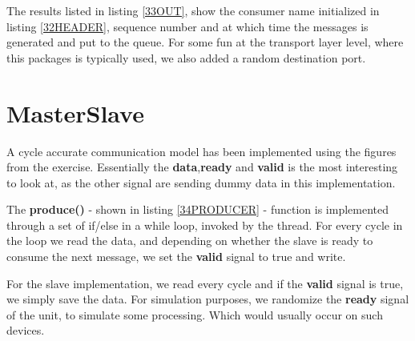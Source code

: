\documentclass[a4paper,12pt]{report}    %
\begin{document}


The results listed in listing \ref{33OUT}, show the consumer name initialized in listing \ref{32HEADER}, sequence number and at which time the messages is generated and put to the queue. For some fun at the transport layer level, where this packages is typically used, we also added a random destination port.

\lstset{style=output}




\newpage

\section{MasterSlave}
A cycle accurate communication model has been implemented using the figures from the exercise. Essentially the \textbf{data},\textbf{ready} and \textbf{valid} is the most interesting to look at, as the other signal are sending dummy data in this implementation.


\lstset{style=code}


The \textbf{produce()} - shown in listing \ref{34PRODUCER} - function is implemented through a set of if/else in a while loop, invoked by the thread. For every cycle in the loop we read the data, and depending on whether the slave is ready to consume the next message, we set the \textbf{valid} signal to true and write. 
\newpage


For the slave implementation, we read every cycle and if the \textbf{valid} signal is true, we simply save the data. For simulation purposes, we randomize the \textbf{ready} signal of the unit, to simulate some processing. Which would usually occur on such devices.


\end{document}
